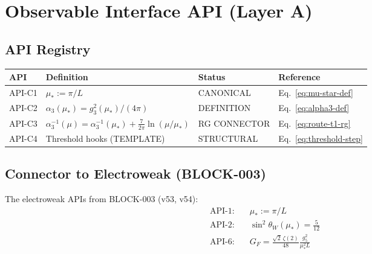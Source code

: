 \documentclass[11pt,a4paper]{article}
\theoremstyle{definition}
\begin{document}
\newpage

\section{Observable Interface API (Layer A)}
\label{sec:observable-api}

\subsection{API Registry}
\label{subsec:api-registry}

\begin{layerabox}
\begin{center}
\begin{tabular}{llll}
\toprule
\textbf{API} & \textbf{Definition} & \textbf{Status} & \textbf{Reference} \\
\midrule
API-C1 & $\mu_* := \pi/L$ & CANONICAL & Eq.~\eqref{eq:mu-star-def} \\
API-C2 & $\alpha_3(\mu_*) = g_3^2(\mu_*)/(4\pi)$ & DEFINITION & Eq.~\eqref{eq:alpha3-def} \\
API-C3 & $\alpha_3^{-1}(\mu) = \alpha_3^{-1}(\mu_*) + \frac{7}{2\pi}\ln(\mu/\mu_*)$ & RG CONNECTOR & Eq.~\eqref{eq:route-t1-rg} \\
API-C4 & Threshold hooks (TEMPLATE) & STRUCTURAL & Eq.~\eqref{eq:threshold-step} \\
\bottomrule
\end{tabular}
\end{center}
\end{layerabox}

\subsection{Connector to Electroweak (BLOCK-003)}
\label{subsec:ew-connector}

The electroweak APIs from BLOCK-003 (v53, v54):
\begin{align}
  \label{eq:ew-apis}
  \text{API-1:} \quad & \mu_* := \pi/L \\
  \text{API-2:} \quad & \sin^2\theta_W(\mu_*) = \frac{5}{12} \\
  \text{API-6:} \quad & G_F = \frac{\sqrt{2}\,\zeta(2)}{48} \frac{g_5^2}{\mu_*^2 L}
\end{align}
\end{document}
